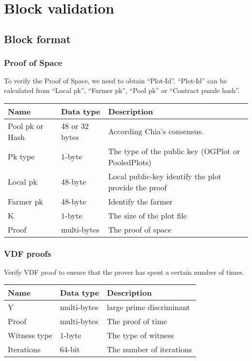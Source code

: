 \section{Block validation}
\subsection{Block format}
\subsubsection{Proof of Space}
\begin{flushleft}
    To verify the Proof of Space, we need to obtain ``Plot-Id''. ``Plot-Id'' can be calculated from ``Local pk'', ``Farmer pk'', ``Pool pk'' or ``Contract puzzle hash''.
\end{flushleft}
\begin{tabular}{ |p{3cm}|p{3cm}|p{6cm}| }
    \hline
    \rowcolor{lightgray}\textbf{Name} & \textbf{Data type} & \textbf{Description} \\[5pt]
    \hline
    Pool pk or Hash & 48 or 32 bytes & According Chia's consensus.\\[5pt]
    \rowcolor{lightgray!30} Pk type & 1-byte & The type of the public key (OGPlot or PooledPlots) \\[5pt]
    Local pk & 48-byte & Local public-key identify the plot provide the proof \\[5pt]
    \rowcolor{lightgray!30} Farmer pk & 48-byte & Identify the farmer \\[5pt]
    K & 1-byte & The size of the plot file \\[5pt]
    \rowcolor{lightgray!30} Proof & multi-bytes & The proof of space \\[5pt]
    \hline
\end{tabular}
\subsubsection{VDF proofs}
\begin{flushleft}
    Verify VDF proof to ensure that the prover has spent a certain number of times.
\end{flushleft}
\begin{tabular}{ |p{3cm}|p{3cm}|p{6cm}| }
    \hline
    \rowcolor{lightgray}\textbf{Name} & \textbf{Data type} & \textbf{Description} \\[5pt]
    \hline
    Y & multi-bytes & large prime discriminant \\[5pt]
    \rowcolor{lightgray!30} Proof & multi-bytes & The proof of time \\[5pt]
    Witness type & 1-byte & The type of witness \\[5pt]
    \rowcolor{lightgray!30} Iterations & 64-bit & The number of iterations \\[5pt]
    \hline
\end{tabular}
